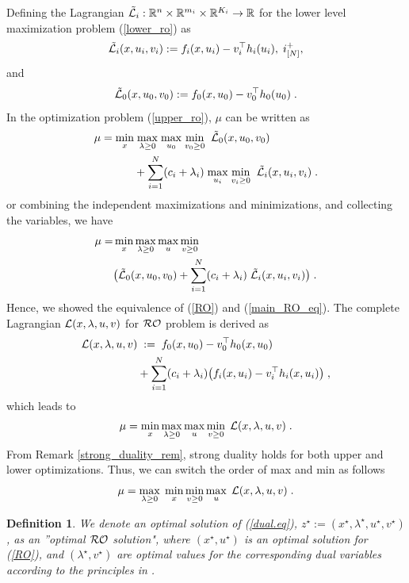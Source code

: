 \documentclass[journal,twoside,web]{ieeecolor}
\newtheorem{definition}{Definition}
\begin{document}
Defining the Lagrangian $\tilde {\cal L}_i:\mathbb{R}^n \times \mathbb{R}^{m_i} \times \mathbb{R}^{K_i} \rightarrow \mathbb{R}$ for the lower level maximization problem (\ref{lower_ro}) as
\begin{align} \label{lower_lag}
\tilde {\cal L}_i(x,u_i,v_i):=f_i(x,u_i)-v_i^\top h_{i}(u_i),\;i^+_{[N]},
\end{align}
and
\begin{align} \label{upper_lag}
\tilde {\cal L}_0(x,u_0,v_0):=f_0(x,u_0)-v_0^\top h_{0}(u_0)\;.
\end{align}
In the optimization problem (\ref{upper_ro}), $\mu$ can be written as
\begin{align} \label{main_RO_eq}
\mu=\underset{x}{\min}&\;\underset{\lambda\geq 0}{\max}\;\underset{u_0}{\max}\;\underset{v_0\geq 0}{\min}\;\; \tilde{\cal L}_0(x,u_0,v_0)\\
&+\sum_{i=1}^N (c_i+\lambda_i)\; \underset{u_i}{\max}\;\underset{v_{i}\geq 0}{\min}\;\;\tilde {\cal L}_i(x,u_i,v_i)\;\nonumber.
\end{align}
or combining the independent maximizations and minimizations, and collecting the variables, we have
\begin{align}\label{main_RO2_eq}
\mu=&\min_{x}\max_{\lambda\geq 0}\max_{u}\min_{v\geq 0} \\
&\big(\tilde{\cal L}_0(x,u_0,v_0)+\sum_{i=1}^N (c_i+\lambda_i) \; \tilde {\cal L}_i(x,u_i,v_i)\big)\;.\nonumber
\end{align}
Hence, we showed the equivalence of (\ref{RO}) and (\ref{main_RO_eq}).
The complete Lagrangian ${\cal L}(x,\lambda,u,v)$ for ${\cal RO}$ problem is derived as
\begin{align}
{\cal L}(x,\lambda,u,v)&\;:=\;f_0(x,u_0)-v_0^\top h_0(x,u_0)\nonumber\\
&+\sum_{i=1}^N (c_i+\lambda_i)\big(f_i(x,u_i)-v_i^\top h_i(x,u_i)\big)\;,
\label{lag}
\end{align}
which leads to
\begin{align*}
\mu=\min_{x}\max_{\lambda\geq 0}\max_{u}\min_{v\geq 0}\;{\cal L}(x,\lambda,u,v)\;.
\end{align*}
From Remark \ref{strong_duality_rem}, strong duality holds for both upper and lower optimizations. Thus, we can switch the order of max and min as follows
\begin{equation}\label{dual.eq}
\mu=\max_{\lambda\geq 0}\;\min_{x}\min_{v\geq 0} \max_{u}\;{\cal L}(x,\lambda,u,v)\;.
\end{equation}

\begin{definition} \label{optimal_ro}
We denote an optimal solution of (\ref{dual.eq}), $z^\star:=(x^\star,\lambda^\star,u^\star,v^\star)$, as an ''optimal ${\cal RO}$ solution", where $(x^\star, u^\star)$ is an optimal solution for (\ref{RO}), and $(\lambda^\star, v^\star)$ are optimal values for the corresponding dual variables according to the principles in \cite[Section~5.9.1]{boyd2004}.
\end{definition}
\end{document}
